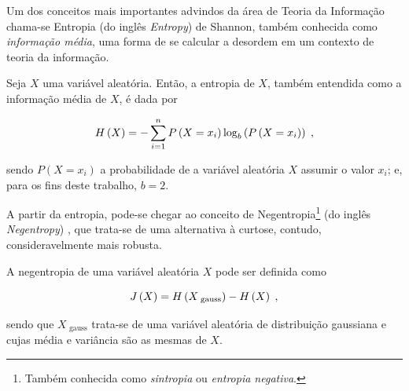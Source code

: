 Um dos conceitos mais importantes advindos da área de Teoria da Informação chama-se Entropia (do inglês \textit{Entropy}) de Shannon, também conhecida como \textit{informação média}, uma forma de se calcular a desordem em um contexto de teoria da informação.\\

\begin{definition}[Entropia]
    Seja $X$ uma variável aleatória. Então, a entropia de $X$, também entendida como a informação média de $X$, é dada por

    \begin{equation}
        H\left(X\right) = - \sum_{i=1}^{n}P\left(X=x_{i}\right) \log_{b} \left(P\left(X=x_{i}\right)\right)
        \hspace{0.1cm},
        \vspace{0.2cm}
        \label{eq:bss_entropy}
    \end{equation}

    \noindent sendo $P(X=x_{i})$ a probabilidade de a variável aleatória $X$ assumir o valor $x_{i}$; e, para os fins deste trabalho, $b=2$.

\end{definition}

A partir da entropia, pode-se chegar ao conceito de Negentropia\footnote{Também conhecida como \textit{sintropia} ou \textit{entropia negativa}.} (do inglês \textit{Negentropy}) \citep{schrodinger1944life, brillouin1953negentropy, mahulikar2009exact}, que trata-se de uma alternativa à curtose, contudo, consideravelmente mais robusta.\\

\begin{definition}[Negentropia]

    A negentropia de uma variável aleatória $X$ pode ser definida como

    \begin{equation}
        J\left(X\right) = H\left(X_{\text{\ gauss}}\right) - H\left(X\right)
        \hspace{0.1cm},
        \vspace{0.2cm}
        \label{eq:bss_negentropy}
    \end{equation}

    \noindent sendo que $X_{\text{\ gauss}}$ trata-se de uma variável aleatória de distribuição gaussiana e cujas média e variância são as mesmas de $X$.

\end{definition}

